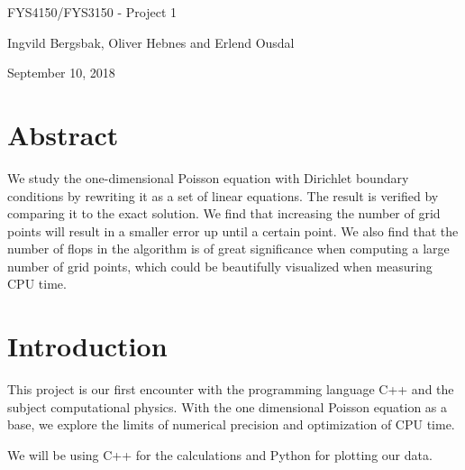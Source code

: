 \documentclass[%
oneside,                 %
final,                   %
10pt]{article}
\begin{document}
\newcommand{\exercisesection}[1]{\subsection*{#1}}


\thispagestyle{empty}

\begin{center}
{\LARGE\bf
\begin{spacing}{1.25}
FYS4150/FYS3150 - Project 1
\end{spacing}
}
\end{center}



\begin{center}
\centerline{{\small Ingvild Bergsbak, Oliver Hebnes and Erlend Ousdal}}
\end{center}



\begin{center}
September 10, 2018
\end{center}

\vspace{1cm}

\newpage{}


\section{Abstract}

We study the one-dimensional Poisson equation with Dirichlet boundary conditions by rewriting it as a set of linear equations.
The result is verified by comparing it to the exact solution. We find that increasing the number of grid points
will result in a smaller error up until a certain point. We also find that the number of flops in the algorithm is of great significance when computing a large number of grid points, which could be beautifully visualized when measuring CPU time.

\section{Introduction}

This project is our first encounter with the programming language C++ and the subject computational physics. With the one dimensional Poisson equation as a base, we explore the limits of numerical precision and optimization of CPU time.

We will be using C++ for the calculations and Python for plotting our data.
\end{document}
